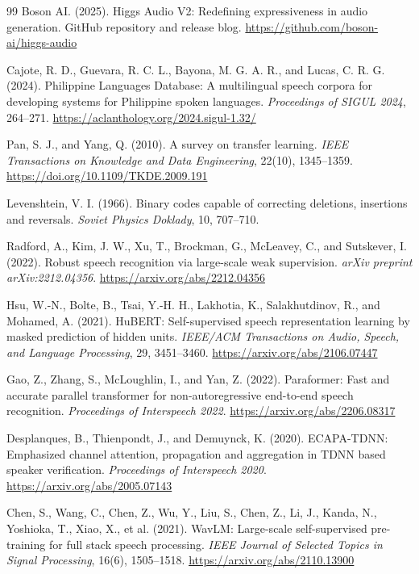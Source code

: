 \documentclass[11pt]{article}
\begin{document}
\begin{thebibliography}{99}
Boson AI. (2025). Higgs Audio V2: Redefining expressiveness in audio generation. GitHub repository and release blog. \url{https://github.com/boson-ai/higgs-audio}

Cajote, R. D., Guevara, R. C. L., Bayona, M. G. A. R., and Lucas, C. R. G. (2024). Philippine Languages Database: A multilingual speech corpora for developing systems for Philippine spoken languages. \textit{Proceedings of SIGUL 2024}, 264--271. \url{https://aclanthology.org/2024.sigul-1.32/}

Pan, S. J., and Yang, Q. (2010). A survey on transfer learning. \textit{IEEE Transactions on Knowledge and Data Engineering}, 22(10), 1345--1359. \url{https://doi.org/10.1109/TKDE.2009.191}

Levenshtein, V. I. (1966). Binary codes capable of correcting deletions, insertions and reversals. \textit{Soviet Physics Doklady}, 10, 707--710.

Radford, A., Kim, J. W., Xu, T., Brockman, G., McLeavey, C., and Sutskever, I. (2022). Robust speech recognition via large-scale weak supervision. \textit{arXiv preprint arXiv:2212.04356}. \url{https://arxiv.org/abs/2212.04356}

Hsu, W.-N., Bolte, B., Tsai, Y.-H. H., Lakhotia, K., Salakhutdinov, R., and Mohamed, A. (2021). HuBERT: Self-supervised speech representation learning by masked prediction of hidden units. \textit{IEEE/ACM Transactions on Audio, Speech, and Language Processing}, 29, 3451--3460. \url{https://arxiv.org/abs/2106.07447}

Gao, Z., Zhang, S., McLoughlin, I., and Yan, Z. (2022). Paraformer: Fast and accurate parallel transformer for non-autoregressive end-to-end speech recognition. \textit{Proceedings of Interspeech 2022}. \url{https://arxiv.org/abs/2206.08317}

Desplanques, B., Thienpondt, J., and Demuynck, K. (2020). ECAPA-TDNN: Emphasized channel attention, propagation and aggregation in TDNN based speaker verification. \textit{Proceedings of Interspeech 2020}. \url{https://arxiv.org/abs/2005.07143}

Chen, S., Wang, C., Chen, Z., Wu, Y., Liu, S., Chen, Z., Li, J., Kanda, N., Yoshioka, T., Xiao, X., et al. (2021). WavLM: Large-scale self-supervised pre-training for full stack speech processing. \textit{IEEE Journal of Selected Topics in Signal Processing}, 16(6), 1505--1518. \url{https://arxiv.org/abs/2110.13900}


\end{thebibliography}
\end{document}
